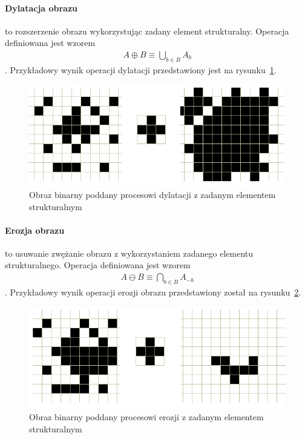 \paragraph {Dylatacja obrazu} to rozszerzenie obrazu wykorzystując zadany element strukturalny. Operacja definiowana jest wzorem
\begin{gather*}
  A \oplus B \equiv \bigcup \limits_{b \in B} A_b
\end{gather*}.
Przykładowy wynik operacji dylatacji przedstawiony jest na rysunku~\ref{fig:dilate}.
\begin{figure}
  \centering
  \includegraphics[width=15cm]{img/dilate}
  \caption{Obraz binarny poddany procesowi dylatacji z zadanym elementem strukturalnym}
  \label{fig:dilate}
\end{figure}
\paragraph {Erozja obrazu} to usuwanie zwężanie obrazu z wykorzystaniem zadanego elementu strukturalnego. Operacja definiowana jest wzorem
\begin{gather*}
  A \ominus B \equiv \bigcap \limits_{b \in B} A_{-b}
\end{gather*}.
Przykładowy wynik operacji erozji obrazu przedstawiony został na rysunku~\ref{fig:erode}.
\begin{figure}
  \centering
  \includegraphics[width=15cm]{img/erode}
  \caption{Obraz binarny poddany procesowi erozji z zadanym elementem strukturalnym}
  \label{fig:erode}
\end{figure}
